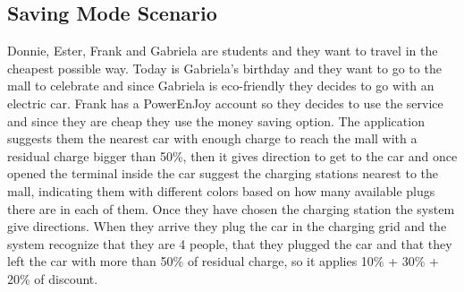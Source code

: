 \subsection{Saving Mode Scenario}
Donnie, Ester, Frank and Gabriela are students and they want to travel in the cheapest possible way. Today is Gabriela's birthday and they want to go to the mall to celebrate and since Gabriela is eco-friendly they decides to go with an electric car. Frank has a PowerEnJoy account so they decides to use the service and since they are cheap they use the money saving option. The application suggests them the nearest car with enough charge to reach the mall with a residual charge bigger than 50\%, then it gives direction to get to the car and once opened the terminal inside the car suggest the charging stations nearest to the mall, indicating them with different colors based on how many available plugs there are in each of them. Once they have chosen the charging station the system give directions. When they arrive  they plug the car in the charging grid and the system recognize that they are 4 people, that they plugged the car and that they left the car with more than 50\% of residual charge, so it applies 10\% + 30\% + 20\% of discount.
